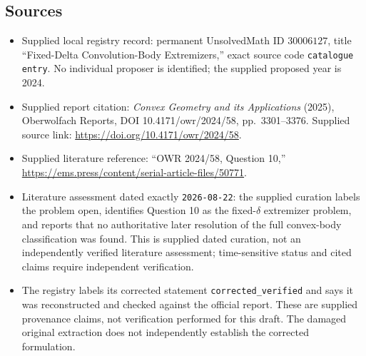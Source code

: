 \documentclass[11pt]{article}
\begin{document}
\subsection{Sources}
\begin{itemize}
\item Supplied local registry record: permanent UnsolvedMath ID \(30006127\), title ``Fixed-Delta Convolution-Body Extremizers,'' exact source code \texttt{catalogue entry}. No individual proposer is identified; the supplied proposed year is 2024.
\item Supplied report citation: \emph{Convex Geometry and its Applications} (2025), Oberwolfach Reports, DOI 10.4171/owr/2024/58, pp.\ 3301--3376. Supplied source link: \url{https://doi.org/10.4171/owr/2024/58}.
\item Supplied literature reference: ``OWR 2024/58, Question 10,'' \url{https://ems.press/content/serial-article-files/50771}.
\item Literature assessment dated exactly \texttt{2026-08-22}: the supplied curation labels the problem open, identifies Question 10 as the fixed-\(\delta\) extremizer problem, and reports that no authoritative later resolution of the full convex-body classification was found. This is supplied dated curation, not an independently verified literature assessment; time-sensitive status and cited claims require independent verification.
\item The registry labels its corrected statement \texttt{corrected\_verified} and says it was reconstructed and checked against the official report. These are supplied provenance claims, not verification performed for this draft. The damaged original extraction does not independently establish the corrected formulation.
\end{itemize}
\end{document}
